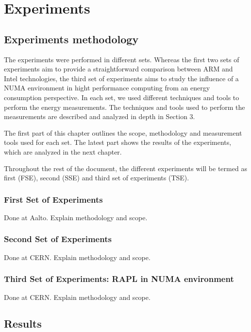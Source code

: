 \chapter{Experiments}

\section{Experiments methodology}

The experiments were performed in different sets. 
Whereas the first two sets of experiments aim to provide a straightforward 
comparison between ARM and Intel technologies, the third set of experiments aims
to study the influence of a NUMA environment in hight performance computing from
an energy consumption perspective.
In each set, we used different
techniques and tools to perform the energy measurements. The techniques and tools
used to perform the measurements are described and analyzed in depth in 
Section 3.

The first part of this chapter outlines the scope, methodology and measurement
tools used for each set. The latest part shows the results of the 
experiments, which are analyzed in the next chapter.

Throughout the rest of the document, the different experiments will be termed as
first (FSE), second (SSE) and third set of experiments (TSE). 

\subsection{First Set of Experiments}
Done at Aalto. Explain methodology and scope.

\subsection{Second Set of Experiments}
Done at CERN. Explain methodology and scope.

\subsection{Third Set of Experiments: RAPL in NUMA environment}
Done at CERN. Explain methodology and scope.

\section{Results}

